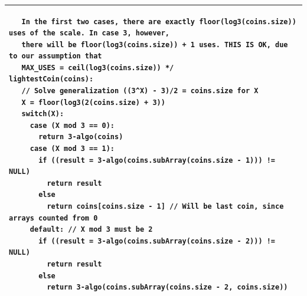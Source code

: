 \documentclass[10pt]{article}
\newenvironment{answer}
    {\begin{center}
    \begin{tabular}{|p{1\textwidth}|}
    \hline
    }
    { 
    \\\hline
    \end{tabular} 
    \end{center}
    }
\begin{document}
\begin{answer}
\begin{verbatim}
   In the first two cases, there are exactly floor(log3(coins.size)) uses of the scale. In case 3, however,
   there will be floor(log3(coins.size)) + 1 uses. THIS IS OK, due to our assumption that
   MAX_USES = ceil(log3(coins.size)) */
lightestCoin(coins):
   // Solve generalization ((3^X) - 3)/2 = coins.size for X
   X = floor(log3(2(coins.size) + 3))
   switch(X):
     case (X mod 3 == 0):
       return 3-algo(coins)
     case (X mod 3 == 1):
       if ((result = 3-algo(coins.subArray(coins.size - 1))) != NULL)
         return result
       else 
         return coins[coins.size - 1] // Will be last coin, since arrays counted from 0
     default: // X mod 3 must be 2
       if ((result = 3-algo(coins.subArray(coins.size - 2))) != NULL)
         return result
       else 
         return 3-algo(coins.subArray(coins.size - 2, coins.size)) 
\end{verbatim}
\end{answer}
\end{document}
